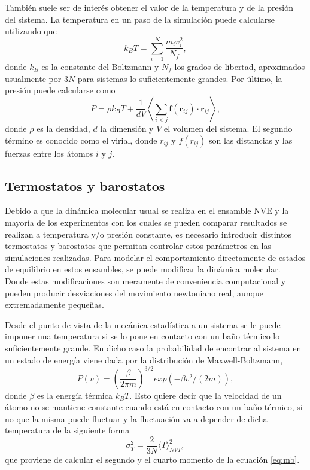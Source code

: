 También suele ser de interés obtener el valor de la temperatura y de la presión
del sistema. La temperatura en un paso de la simulación puede calcularse 
utilizando que
\begin{equation}\label{eq:tempvel}
    k_B T = \sum_{i=1}^N \frac{m_i v_i^2}{N_f},
\end{equation}
donde $k_B$ es la constante del Boltzmann y $N_f$ los grados de libertad,
aproximados usualmente por $3N$ para sistemas lo suficientemente grandes. Por 
último, la presión puede calcularse como 
$$
P = \rho k_B T + \frac{1}{d V} \left\langle \sum_{i<j} \mathbf{f}(\mathbf{r}_{ij}) \cdot \mathbf{r}_{ij} \right\rangle,
$$
donde $\rho$ es la densidad, $d$ la dimensión y $V$ el volumen del sistema. El
segundo término es conocido como el virial, donde $r_{ij}$ y $f(r_{ij})$ son las 
distancias y las fuerzas entre los átomos $i$ y $j$.

\subsection{Termostatos y barostatos}

Debido a que la dinámica molecular usual se realiza en el ensamble NVE y la 
mayoría de los experimentos con los cuales se pueden comparar resultados se 
realizan a temperatura y/o presión constante, es necesario introducir distintos
termostatos y barostatos que permitan controlar estos parámetros en las 
simulaciones realizadas. Para modelar el comportamiento directamente de estados
de equilibrio en estos ensambles, se puede modificar la dinámica molecular. Donde
estas modificaciones son meramente de conveniencia computacional y pueden producir 
desviaciones del movimiento newtoniano real, aunque extremadamente pequeñas.

Desde el punto de vista de la mecánica estadística a un sistema se le puede 
imponer una temperatura si se lo pone en contacto con un baño térmico lo 
suficientemente grande. En dicho caso la probabilidad de encontrar al sistema en
un estado de energía viene dada por la distribución de Maxwell-Boltzmann,
\begin{equation}\label{eq:mb}
P(v) = \left( \frac{\beta}{2\pi m} \right)^{3/2} exp(-\beta v^2 / (2m)),
\end{equation}
donde $\beta$ es la energía térmica $k_BT$. Esto quiere decir que la velocidad de
un átomo no se mantiene constante cuando está en contacto con un baño térmico, si 
no que la misma puede fluctuar y la fluctuación va a depender de dicha temperatura
de la siguiente forma
$$
\sigma_T^2 = \frac{2}{3 N} \langle T \rangle_{NVT}^2,
$$
que proviene de calcular el segundo y el cuarto momento de la ecuación \ref{eq:mb}.

